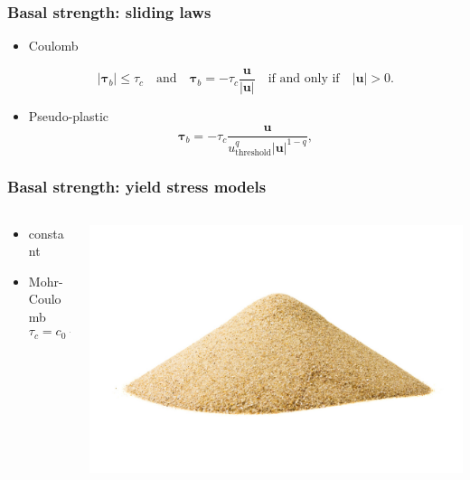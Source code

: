 \documentclass[hide notes,intlimits]{beamer}
\begin{document}
\begin{frame}
  \frametitle{Basal strength: sliding laws}

  \begin{itemize}
  \item Coulomb

    \begin{equation*}
      \label{eq:11}
      |\boldsymbol{\tau}_b| \le \tau_c \quad \text{and} \quad \boldsymbol{\tau}_b =
      - \tau_c \frac{\mathbf{u}}{|\mathbf{u}|} \quad\text{if and only if}\quad |\mathbf{u}| > 0.
    \end{equation*}
  \item Pseudo-plastic
  \begin{equation*}
    \label{eq:10}
    \boldsymbol{\tau}_b =  - \tau_c \frac{\mathbf{u}}{u_{\text{threshold}}^q |\mathbf{u}|^{1-q}},
  \end{equation*}
  \end{itemize}
\end{frame}

\begin{frame}
  \frametitle{Basal strength: yield stress models}

  \begin{columns}
    \begin{column}{0.5\linewidth}
      \begin{itemize}
      \item constant
      \item Mohr-Coulomb
        \begin{equation*}
          \label{eq:12}
          \tau_c = c_{0} + (\tan\phi)\,N_{till}.
        \end{equation*}
      \end{itemize}
    \end{column}

    \begin{column}{0.5\linewidth}
      \includegraphics[width=\linewidth]{sand-pile}
    \end{column}
  \end{columns}

\end{frame}
\end{document}
